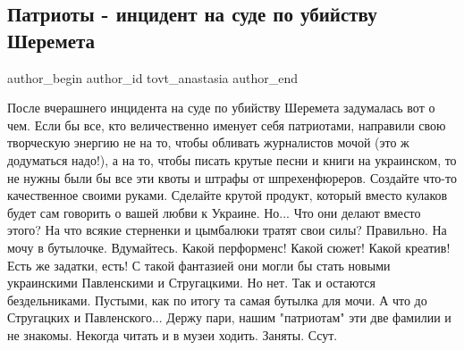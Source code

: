  
 
 
 
 
 
\subsection{Патриоты - инцидент на суде по убийству Шеремета}
\label{sec:25_12_2019.fb.tovt_anastasia.1.patriotizm_incident_sud_sheremet}
 
\ifcmt
 author_begin
   author_id tovt_anastasia
 author_end
\fi

\obeycr
После вчерашнего инцидента на суде по убийству Шеремета задумалась вот о чем.
Если бы все, кто величественно именует себя патриотами, направили свою творческую энергию не на то, чтобы обливать журналистов мочой (это ж додуматься надо!), а на то, чтобы писать крутые песни и книги на украинском, то не нужны были бы все эти квоты и штрафы от шпрехенфюреров. 
Создайте что-то качественное своими руками. Сделайте крутой продукт, который вместо кулаков будет сам говорить о вашей любви к Украине. 
Но... Что они делают вместо этого? 
На что всякие стерненки и цымбалюки тратят свои силы?
Правильно.
На мочу в бутылочке.
Вдумайтесь. Какой перформенс! Какой сюжет! Какой креатив! 
Есть же задатки, есть! 
С такой фантазией они могли бы стать новыми украинскими Павленскими и Стругацкими. 
Но нет. 
Так и остаются бездельниками. Пустыми, как по итогу та самая бутылка для мочи. 
А что до Стругацких и Павленского...
Держу пари, нашим "патриотам" эти две фамилии и не знакомы. 
Некогда читать и в музеи ходить. Заняты. Ссут.
\restorecr

